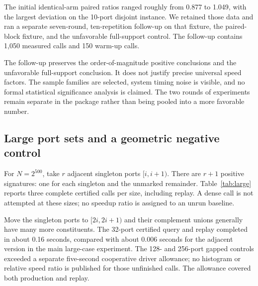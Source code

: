 \documentclass[11pt,letterpaper]{article}
\theoremstyle{definition}\newtheorem{definition}[theorem]{Definition}
\theoremstyle{remark}\newtheorem{remark}[theorem]{Remark}
\begin{document}
The initial identical-arm paired ratios ranged roughly from 0.877 to 1.049, with the largest deviation on the 10-port disjoint instance. We retained those data and ran a separate seven-round, ten-repetition follow-up on that fixture, the paired-block fixture, and the unfavorable full-support control. The follow-up contains 1,050 measured calls and 150 warm-up calls.

\begin{table}[H]
\centering\small

\caption{Longer-batch follow-up. ``Paired gain'' is the median of same-round dense/split ratios, not the ratio of the displayed medians. Split/control compares identical implementations.}
\label{tab:followup}
\end{table}

The follow-up preserves the order-of-magnitude positive conclusions and the unfavorable full-support conclusion. It does not justify precise universal speed factors. The sample families are selected, system timing noise is visible, and no formal statistical significance analysis is claimed. The two rounds of experiments remain separate in the package rather than being pooled into a more favorable number.

\subsection{Large port sets and a geometric negative control}

For $N=2^{500}$, take $r$ adjacent singleton ports $[i,i+1)$. There are $r+1$ positive signatures: one for each singleton and the unmarked remainder. Table~\ref{tab:large} reports three complete certified calls per size, including replay. A dense call is not attempted at these sizes; no speedup ratio is assigned to an unrun baseline.

\begin{table}[H]
\centering\small

\caption{Adjacent singleton ports on a binary $2^{500}$-point static universe. A literal dense answer has $2^r$ slots, but the sparse answer has $r+1$ entries.}
\label{tab:large}
\end{table}

Move the singleton ports to $[2i,2i+1)$ and their complement unions generally have many more constituents. The 32-port certified query and replay completed in about 0.16 seconds, compared with about 0.006 seconds for the adjacent version in the main large-case experiment. The 128- and 256-port gapped controls exceeded a separate five-second cooperative driver allowance; no histogram or relative speed ratio is published for those unfinished calls. The allowance covered both production and replay.
\end{document}
